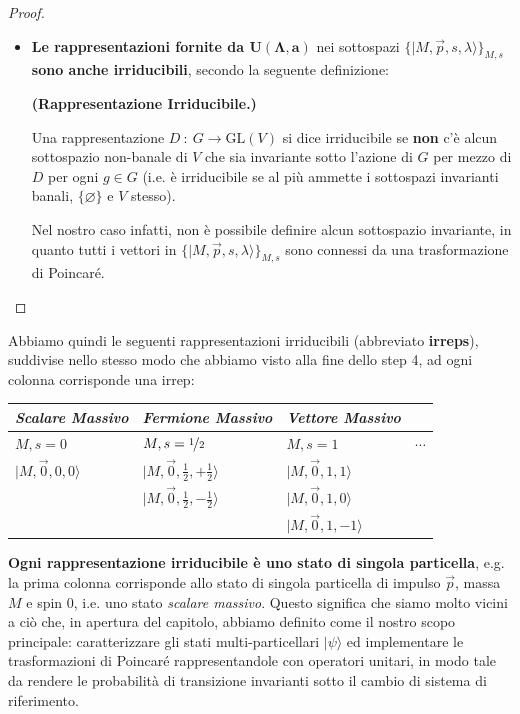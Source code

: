 \documentclass[../main.tex]{subfiles}
\begin{document}
\begin{proof}
\begin{itemize}
    \item[\blacksquare] \textbf{Le rappresentazioni fornite da $\mathbf{U(\Lambda,a)}$} nei sottospazi \(\Big\{|M,\Vec{p},s,\lambda\rangle\Big\}_{M,s}\) \textbf{sono anche irriducibili}, secondo la seguente definizione:
    \begin{definition}
        \textbf{(Rappresentazione Irriducibile.)}
        
        Una rappresentazione \(D~:~ G\rightarrow \text{GL}(V)\) si dice irriducibile se \textbf{non} c'è alcun sottospazio non-banale di $V$ che sia invariante sotto l'azione di $G$ per mezzo di $D$ per ogni $g\in G$ (i.e. è irriducibile se al più ammette i sottospazi invarianti banali, $\{\varnothing\}$ e $V$ stesso).
        \label{def:irrep}
    \end{definition}
    Nel nostro caso infatti, non è possibile definire alcun sottospazio invariante, in quanto tutti i vettori in \(\Big\{|M,\Vec{p},s,\lambda\rangle\Big\}_{M,s}\) sono connessi da una trasformazione di Poincaré.
\end{itemize}
\end{proof}

Abbiamo quindi le seguenti rappresentazioni irriducibili (abbreviato \textbf{irreps}), suddivise nello stesso modo che abbiamo visto alla fine dello step 4, ad ogni colonna corrisponde una irrep:
\begin{center}
    \begin{tabular}{|l|l|l|l|}
    \textit{Scalare Massivo}               & \textit{Fermione Massivo}                    & \textit{Vettore Massivo} \\
    \hline
    $M, s=0$                      &   $M, s=\nicefrac{1}{2}$            &   $M, s=1$                      & $\cdots$  \\
    \hline
    \(|M, \Vec{0}, 0, 0\rangle\)    &   \(|M, \Vec{0}, \frac{1}{2}, +\frac{1}{2}\rangle\)    &   \(|M, \Vec{0}, 1, 1\rangle\)    & \\
                                    &   \(|M, \Vec{0}, \frac{1}{2}, -\frac{1}{2}\rangle\)    &   \(|M, \Vec{0}, 1, 0\rangle\)    & \\
                                    &                                                        &   \(|M, \Vec{0}, 1, -1\rangle\)   & \\ \hline
    \end{tabular}
\end{center}
\textbf{Ogni rappresentazione irriducibile è uno stato di singola particella}, e.g. la prima colonna corrisponde allo stato di singola particella di impulso $\Vec{p}$, massa $M$ e spin $0$, i.e. uno stato \textit{scalare massivo}. Questo significa che siamo molto vicini a ciò che, in apertura del capitolo, abbiamo definito come il nostro scopo principale: caratterizzare gli stati multi-particellari $|\psi\rangle$ ed implementare le trasformazioni di Poincaré rappresentandole con operatori unitari, in modo tale da rendere le probabilità di transizione invarianti sotto il cambio di sistema di riferimento.
\end{document}
